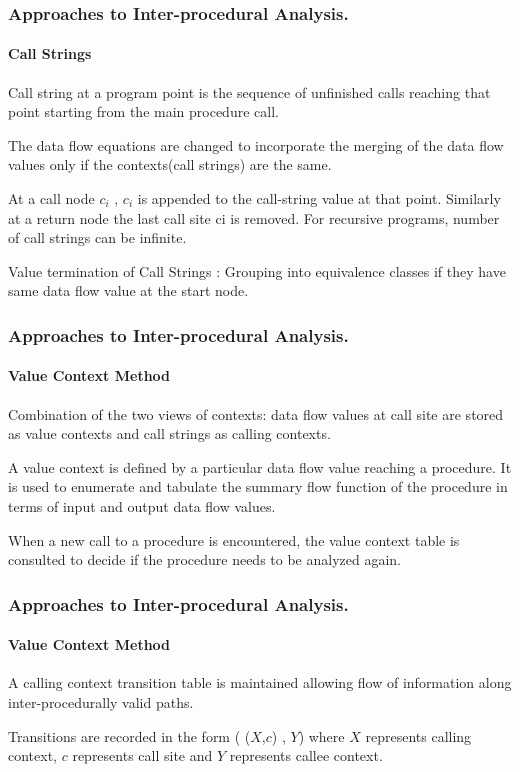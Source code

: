 \documentclass{beamer}
\begin{document}
  \begin{frame}
  \frametitle{Approaches to Inter-procedural Analysis.}
  \framesubtitle{Call Strings}
  Call string at a program point is the sequence of unfinished calls reaching that point starting from the main procedure call.\vspace{\baselineskip}
  
  The data flow equations are changed to incorporate the merging of the data flow values only if the contexts(call strings) are the same.\vspace{\baselineskip}
  
  At a call node $c_i$ , $c_i$ is appended to the call-string value at that point. Similarly at a return node the last call site ci is removed. For recursive programs, number of call strings can be infinite. \vspace{\baselineskip}
  
  Value termination of Call Strings : Grouping into equivalence classes if they have same data flow value at the start node.
  \end{frame}
  
  \begin{frame}
  \frametitle{Approaches to Inter-procedural Analysis.}
  \framesubtitle{Value Context Method}
  Combination of the two views of contexts: data flow values at call site are stored as value contexts and call strings as calling contexts. 
  \vspace{\baselineskip}
  
  A value context is defined by a particular data flow value reaching a procedure. It is used to enumerate and tabulate the summary flow function of the procedure in terms of input and output data flow values.  

  \vspace{\baselineskip}
  When a new call to a procedure is encountered, the value context table is consulted to decide if the procedure needs to be analyzed again.
  
  
  \end{frame}
  
  \begin{frame}
  \frametitle{Approaches to Inter-procedural Analysis.}
  \framesubtitle{Value Context Method}
	 A calling context transition table is maintained  allowing flow of information along inter-procedurally valid paths. 
	
	\vspace{\baselineskip}
	Transitions are recorded in the form ( ($X$,$c$) , $Y$) where $X$ represents calling context, $c$ represents call site and $Y$ represents callee context.
	
	\vspace{\baselineskip}
	 
	
  \end{frame}
  
\end{document}
